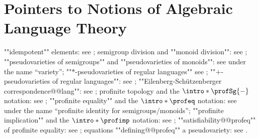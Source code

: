 \section{Pointers to Notions of Algebraic Language Theory}
\label{apdx:pointers-pin}

\begin{itemize}
	\itemAP ""idempotent"" elements:
		see \cite[\S II.1.2, p.~14]{Pin2022MathematicalFoundations};
	\itemAP semigroup division and ""monoid division"":
		see \cite[\S II.3.3, p.~21]{Pin2022MathematicalFoundations};
	\itemAP ""pseudovarieties of semigroups"" and ""pseudovarieties of monoids"":
		see \cite[\S XI.1, p.~189]{Pin2022MathematicalFoundations} under the name ``variety'';
	\itemAP ""$\ast $-pseudovarieties of regular languages""
		see \cite[\S XIII.3, p.~226]{Pin2022MathematicalFoundations};
	\itemAP ""$+$-pseudovarieties of regular languages"":
		see \cite[\S XIII.4, ``Eilenberg’s $+$-varieties'', p.~229]{Pin2022MathematicalFoundations};
	\itemAP ""Eilenberg-Schützenberger correspondence@@lang"":
		see \cite[Theorem XIII.4.10, p.~228]{Pin2022MathematicalFoundations};
	\itemAP profinite topology and the $\intro*\profSg{-}$ notation:
		see \cite[\S X.2, p.~178]{Pin2022MathematicalFoundations};
	\itemAP ""profinite equality"" and the $\intro*\profeq$ notation:
		see \cite[\S XI.3, p.~193]{Pin2022MathematicalFoundations} under
		the name ``profinite identity for semigroups/monoids'';
	\itemAP ""profinite implication"" and the $\intro*\profimp$ notation:
		see \cite[\S XIII.1, p.~223]{Pin2022MathematicalFoundations};
	\itemAP ""satisfiability@@profeq"" of profinite equality:
		see \cite[\S XI.3, p.~193]{Pin2022MathematicalFoundations};
	\itemAP equations ""defining@@profeq"" a pseudovariety:
		see \cite[\S XI.3.3, p.~194]{Pin2022MathematicalFoundations}.
\end{itemize}